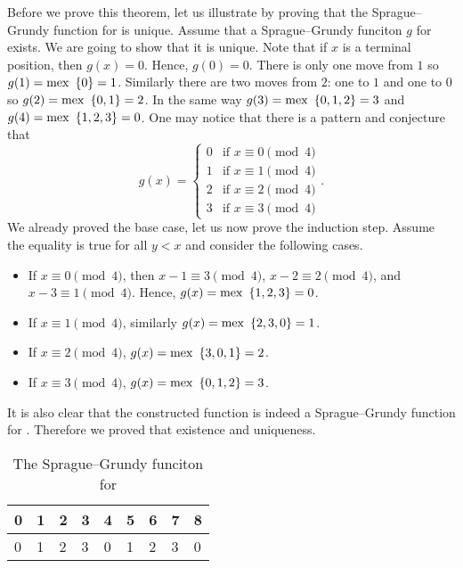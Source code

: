 Before we prove this theorem, let us illustrate by proving that the
Sprague--Grundy function for  is unique.
Assume that a Sprague--Grundy funciton $g$ for 
exists. We are going to show that it is unique.
Note that if $x$ is a terminal position, then $g(x) = 0$. Hence, $g(0) = 0$.
There is only one move from $1$ so $g(1) = \mex \set{0} = 1$. Similarly
there are two moves from $2$: one to $1$ and one to $0$ so
$g(2) = \mex \set{0, 1} = 2$. In the same way $g(3) = \mex \set{0, 1, 2} = 3$
and $g(4) = \mex \set{1, 2, 3} = 0$.
One may notice that there is a pattern and conjecture that
\[
  g(x) =
  \begin{cases}
      0 & \text{if } x \equiv 0 \pmod{4} \\
      1 & \text{if } x \equiv 1 \pmod{4} \\
      2 & \text{if } x \equiv 2 \pmod{4} \\
      3 & \text{if } x \equiv 3 \pmod{4}
  \end{cases}.
\]
We already proved the base case, let us now prove the induction step.
Assume the equality is true for all $y < x$ and consider the following cases.
\begin{itemize}
    \item If $x \equiv 0 \pmod{4}$, then $x - 1 \equiv 3 \pmod{4}$,
        $x - 2 \equiv 2 \pmod{4}$, and $x - 3 \equiv 1 \pmod{4}$.
        Hence, $g(x) = \mex \set{1, 2, 3} = 0$.
    \item If $x \equiv 1 \pmod{4}$, similarly $g(x) = \mex \set{2, 3, 0} = 1$.
    \item If $x \equiv 2 \pmod{4}$, $g(x) = \mex \set{3, 0, 1} = 2$.
    \item If $x \equiv 3 \pmod{4}$, $g(x) = \mex \set{0, 1, 2} = 3$.
\end{itemize}
It is also clear that the constructed function is indeed a Sprague--Grundy
function for . Therefore we proved that
existence and uniqueness.
\begin{table}
  \centering
  \begin{tabular}{l l l l l l l l l}
      \toprule
      0 & 1 & 2 & 3 & 4 & 5 & 6 & 7 & 8 \\
      \midrule
      0 & 1 & 2 & 3 & 0 & 1 & 2 & 3 & 0 \\
      \bottomrule
  \end{tabular}
  \caption{The Sprague--Grundy funciton for }
  \label{table:take-away-21-3-2-1-grundy}
  \vskip 10pt
\end{table}

